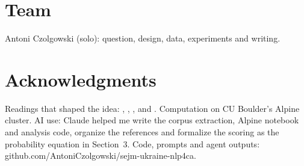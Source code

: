 \documentclass[10pt,twocolumn]{article}
\begin{document}
\section*{Team}
Antoni Czolgowski (solo): question, design, data, experiments and writing.

\section*{Acknowledgments}
Readings that shaped the idea: \citet{danescu2013}, \citet{underwood2026}, \citet{barron2018}, \citet{soni2021} and \citet{chang2023}. Computation on CU Boulder's Alpine cluster. AI use: Claude helped me write the corpus extraction, Alpine notebook and analysis code, organize the references and  formalize the scoring as the probability equation in Section~3. Code, prompts and agent outputs: github.com/AntoniCzolgowski/sejm-ukraine-nlp4ca.
\end{document}
